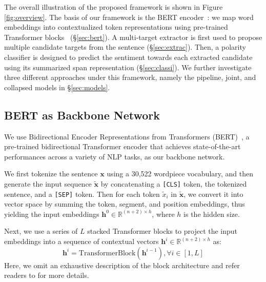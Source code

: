 \documentclass[11pt,a4paper]{article}
\begin{document}
The overall illustration of the proposed framework is shown in Figure \ref{fig:overview}. 
The basis of our framework is the BERT encoder~\cite{devlin2018bert}: we map word embeddings into contextualized token representations using pre-trained Transformer blocks~\cite{vaswani2017attention} (\S\ref{sec:bert}).
A multi-target extractor is first used to propose multiple candidate targets from the sentence (\S\ref{sec:extrac}). 
Then, a polarity classifier is designed to predict the sentiment towards each extracted candidate using its summarized span representation (\S\ref{sec:classi}).
We further investigate three different approaches under this framework, namely the pipeline, joint, and collapsed models in \S\ref{sec:models}.


\subsection{BERT as Backbone Network		\label{sec:bert}}
We use Bidirectional Encoder Representations from Transformers (BERT)~\cite{devlin2018bert}, a pre-trained bidirectional Transformer encoder that achieves state-of-the-art performances across a variety of NLP tasks, as our backbone network.

We first tokenize the sentence $\mathbf{x}$ using a 30,522 wordpiece vocabulary, and then generate the input sequence $\mathbf{\tilde{x}}$ by concatenating a \texttt{[CLS]} token, the tokenized sentence, and a \texttt{[SEP]} token.
Then for each token $\tilde{x}_i$ in $\mathbf{\tilde{x}}$, we convert it into vector space by summing the token, segment, and position embeddings, thus yielding the input embeddings $\mathbf{h}^0 \in\mathbb{R}^{(n+2) \times h}$, where $h$ is the hidden size.

Next, we use a series of $L$ stacked Transformer blocks to project the input embeddings into a sequence of contextual vectors $\mathbf{h}^i \in\mathbb{R}^{(n+2) \times h}$ as:
\begin{equation}
\mathbf{h}^i = \mathrm{TransformerBlock}(\mathbf{h}^{i-1}), \forall i \in [1,L]	\nonumber
\end{equation}
Here, we omit an exhaustive description of the block architecture and refer readers to \citet{vaswani2017attention} for more details.
\end{document}

